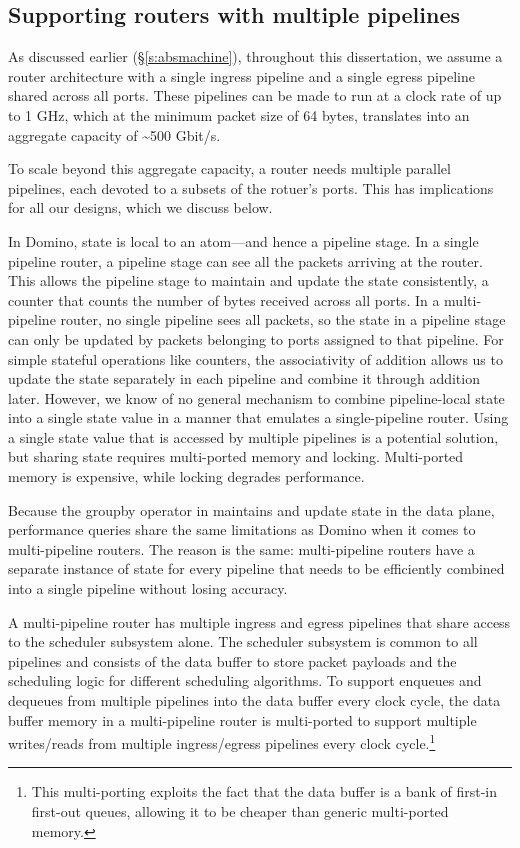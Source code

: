 \subsection{Supporting routers with multiple pipelines}
\label{ss:multiple}

As discussed earlier (\S\ref{s:absmachine}), throughout this dissertation, we
assume a router architecture with a single ingress pipeline and a single egress
pipeline shared across all ports. These pipelines can be made to run at a clock
rate of up to 1 GHz, which at the minimum packet size of 64 bytes, translates
into an aggregate capacity of \textasciitilde500 Gbit/s.

To scale beyond this aggregate capacity, a router needs multiple parallel
pipelines, each devoted to a subsets of the rotuer's ports. This has
implications for all our designs, which we discuss below.

 In Domino, state is local to an atom---and hence a pipeline
stage.  In a single pipeline router, a pipeline stage can see all the packets
arriving at the router. This allows the pipeline stage to maintain and update
the state consistently, \eg a counter that counts the number of bytes received
across all ports. In a multi-pipeline router, no single pipeline sees all
packets, so the state in a pipeline stage can only be updated by packets
belonging to ports assigned to that pipeline. For simple stateful operations
like counters, the associativity of addition allows us to update the state
separately in each pipeline and combine it through addition later. However, we
know of no general mechanism to combine pipeline-local state into a single
state value in a manner that emulates a single-pipeline router. Using a single
state value that is accessed by multiple pipelines is a potential solution, but
sharing state requires multi-ported memory and locking. Multi-ported memory is
expensive, while locking degrades performance.

 Because the {\ct groupby} operator in \TheSystem
maintains and update state in the data plane, performance queries share the
same limitations as Domino when it comes to multi-pipeline routers. The reason
is the same: multi-pipeline routers have a separate instance of state for every
pipeline that needs to be efficiently combined into a single pipeline without
losing accuracy.

 A multi-pipeline router has multiple ingress and egress pipelines
that share access to the scheduler subsystem alone. The scheduler subsystem is
common to all pipelines and consists of the data buffer to store packet
payloads and the scheduling logic for different scheduling algorithms. To
support enqueues and dequeues from multiple pipelines into the data buffer
every clock cycle, the data buffer memory in a multi-pipeline router is
multi-ported to support multiple writes/reads from multiple ingress/egress
pipelines every clock cycle.\footnote{This multi-porting exploits the fact that
the data buffer is a bank of first-in first-out queues, allowing it to be
cheaper than generic multi-ported memory.}

